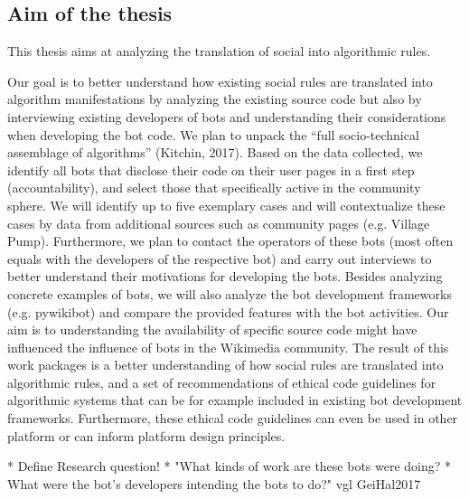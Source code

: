 \documentclass[pdftex,a4paper,11pt]{scrartcl}
\begin{document}
\subsection{Aim of the thesis}
This thesis aims at analyzing the translation of social into algorithmic rules.

Our goal is to better understand how existing social rules are 
translated into algorithm manifestations by analyzing the existing 
source code but also by interviewing existing developers of bots and 
understanding their considerations when developing the bot code. We plan 
to unpack the “full socio-technical assemblage of algorithms” (Kitchin, 
2017). Based on the data collected, we identify all bots that disclose 
their code on their user pages in a first step (accountability), and 
select those that specifically active in the community sphere. We will 
identify up to five exemplary cases and will contextualize these cases 
by data from additional sources such as community pages (e.g. Village 
Pump). Furthermore, we plan to contact the operators of these bots (most 
often equals with the developers of the respective bot) and carry out 
interviews to better understand their motivations for developing the 
bots. Besides analyzing concrete examples of bots, we will also analyze 
the bot development frameworks (e.g. pywikibot) and compare the provided 
features with the bot activities. Our aim is to understanding the 
availability of specific source code might have influenced the influence 
of bots in the Wikimedia community. The result of this work packages is 
a better understanding of how social rules are translated into 
algorithmic rules, and a set of recommendations of ethical code 
guidelines for algorithmic systems that can be for example included in 
existing bot development frameworks. Furthermore, these ethical code 
guidelines can even be used in other platform or can inform platform 
design principles.

* Define Research question!
  * "What kinds of work are these bots were doing?
  * What were the bot’s developers intending the bots to do?" vgl GeiHal2017
\begin{comment}
\begin{itemize}
	\item Die Ziele sollten so spezifisch wie möglich sein. Das hilft Ihnen im Verlauf der Umsetzung zu prüfen, ob Sie Ihre Ziele erreichen konnten. Bitte achten Sie darauf, dass die gesetzten Ziele realistisch sind und das Sie in der Lage sind, das erfolgreiche Erreichen dieser Ziele im Bereich Evaluation zu prüfen.
\end{itemize}
\end{comment}
\end{document}
